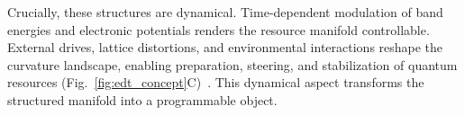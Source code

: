 \documentclass[twocolumn,10pt]{article}
\begin{document}
%

Crucially, these structures are dynamical. Time-dependent modulation of band energies and electronic potentials renders the resource manifold controllable. External drives, lattice distortions, and environmental interactions reshape the curvature landscape, enabling preparation, steering, and stabilization of quantum resources (Fig.~\ref{fig:edt_concept}C)~\cite{Bukov2015,Eckardt2017}. This dynamical aspect transforms the structured manifold into a programmable object.
\end{document}

